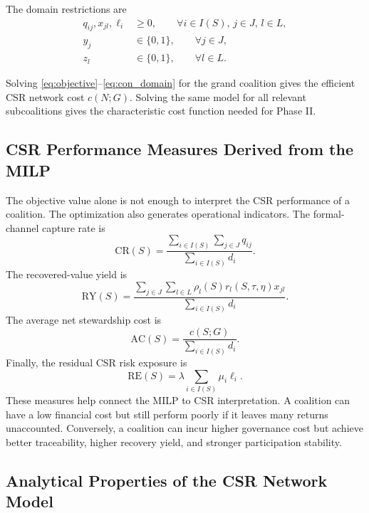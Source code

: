 The domain restrictions are
\begin{equation}
\label{eq:con_domain}
\begin{aligned}
q_{ij},x_{jl},\ell_i&\geq 0,
\qquad \forall i\in I(S),\, j\in J,\, l\in L,\\
y_j&\in\{0,1\},
\qquad \forall j\in J,\\
z_l&\in\{0,1\},
\qquad \forall l\in L.
\end{aligned}
\end{equation}

Solving \eqref{eq:objective}--\eqref{eq:con_domain} for the grand coalition gives the efficient CSR network cost $c(N;G)$. Solving the same model for all relevant subcoalitions gives the characteristic cost function needed for Phase II.

\subsection{CSR Performance Measures Derived from the MILP}

The objective value alone is not enough to interpret the CSR performance of a coalition. The optimization also generates operational indicators. The formal-channel capture rate is
\begin{equation}
\label{eq:ch4_capture_rate}
\mathrm{CR}(S)=
\frac{\sum_{i\in I(S)}\sum_{j\in J}q_{ij}}
{\sum_{i\in I(S)}d_i}.
\end{equation}
The recovered-value yield is
\begin{equation}
\label{eq:ch4_recovery_yield}
\mathrm{RY}(S)=
\frac{\sum_{j\in J}\sum_{l\in L}\rho_l(S)r_l(S,\tau,\eta)x_{jl}}
{\sum_{i\in I(S)}d_i}.
\end{equation}
The average net stewardship cost is
\begin{equation}
\label{eq:ch4_average_cost}
\mathrm{AC}(S)=
\frac{c(S;G)}
{\sum_{i\in I(S)}d_i}.
\end{equation}
Finally, the residual CSR risk exposure is
\begin{equation}
\label{eq:ch4_residual_risk}
\mathrm{RE}(S)=
\lambda\sum_{i\in I(S)}\mu_i\ell_i.
\end{equation}
These measures help connect the MILP to CSR interpretation. A coalition can have a low financial cost but still perform poorly if it leaves many returns unaccounted. Conversely, a coalition can incur higher governance cost but achieve better traceability, higher recovery yield, and stronger participation stability.

\subsection{Analytical Properties of the CSR Network Model}

